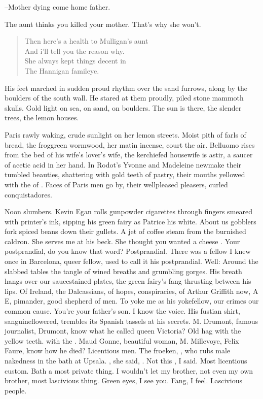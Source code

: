 --Mother dying come home father.

The aunt thinks you killed your mother.
That's why she won't.


\begin{verse}
    Then here's a health to Mulligan's aunt \\
    And i'll tell you the reason why. \\
    She always kept things decent in \\
    The Hannigan famileye.
\end{verse}


His feet marched in sudden proud rhythm over the sand furrows,
along by the boulders of the south wall.
He stared at them proudly,
piled stone mammoth skulls.
Gold light on sea, on sand, on boulders.
The sun is there, the slender trees, the lemon houses.

Paris rawly waking, crude sunlight on her lemon streets.
Moist pith of farls of bread,
the froggreen wormwood,
her matin incense,
court the air.
Belluomo rises from the bed of his wife's lover's wife,
the kerchiefed housewife is astir,
a saucer of acetic acid in her hand.
In Rodot's
Yvonne and Madeleine newmake their tumbled beauties,
shattering with gold teeth  of pastry,
their mouths yellowed with the  of .
Faces of Paris men go by, their wellpleased pleasers,
curled conquistadores.

Noon slumbers.
Kevin Egan rolls gunpowder cigarettes
through fingers smeared with printer's ink,
sipping his green fairy
as Patrice his white.
About us gobblers fork spiced beans down their gullets.
A jet of coffee steam from the burnished caldron.
She serves me at his beck.
She thought you wanted a cheese .
Your postprandial, do you know that word?
Postprandial.
There was a fellow I knew once in Barcelona, queer fellow,
used to call it his postprandial.
Well:
Around the slabbed tables
the tangle of wined breaths and grumbling gorges.
His breath hangs over our saucestained plates,
the green fairy's fang thrusting between his lips.
Of Ireland, the Dalcassians,
of hopes, conspiracies,
of Arthur Griffith now, A E,
pimander, good shepherd of men.
To yoke me as his yokefellow,
our crimes our common cause.
You're your father's son.
I know the voice.
His fustian shirt, sanguineflowered,
trembles its Spanish tassels at his secrets.
M. Drumont, famous journalist, Drumont,
know what he called queen Victoria?
Old hag with the yellow teeth.
 with the .
Maud Gonne, beautiful woman,
M. Millevoye,
Felix Faure, know how he died?
Licentious men.
The froeken, ,
who rubs male nakedness in the bath at Upsala.
, she said, .
Not this , I said.
Most licentious custom.
Bath a most private thing.
I wouldn't let my brother, not even my own brother,
most lascivious thing.
Green eyes, I see you.
Fang, I feel.
Lascivious people.

